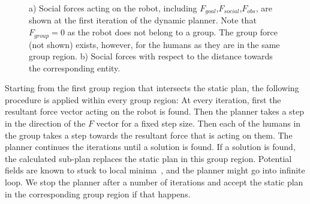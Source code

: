 \documentclass[12pt]{gatech-thesis}
\begin{document}
\begin{figure}[ht!]
\centering
%
    \caption{%
	a) Social forces acting on the robot, including $F_{goal}$,$F_{social}$,$F_{obs}$, are shown at the first iteration of the dynamic planner. Note that $F_{group}=0$ as the robot does not belong to a group. The group force (not shown) exists, however, for the humans as they are in the same group region. b) Social forces with respect to the distance towards the corresponding entity.
     }%
   \label{fig:forces}
\end{figure}


Starting from the first group region that intersects the static plan, the following procedure is applied within every group region: At every iteration, first the resultant force vector acting on the robot is found. Then the planner takes a step in the direction of the $F$ vector for a fixed step size. Then each of the humans in the group takes a step towards the resultant force that is acting on them. The planner continues the iterations until a solution is found. If a solution is found, the calculated sub-plan replaces the static plan in this group region. Potential fields are known to stuck to local minima~\cite{koren1991potential}, and the planner might go into infinite loop. We stop the planner after a number of iterations and accept the static plan in the corresponding group region if that happens.
\end{document}
